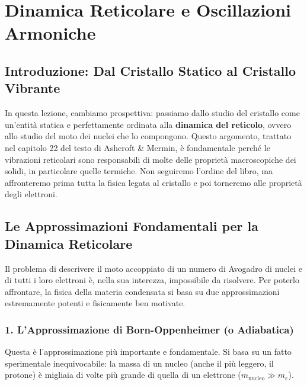 
\section{Dinamica Reticolare e Oscillazioni Armoniche}

\subsection{Introduzione: Dal Cristallo Statico al Cristallo Vibrante}
In questa lezione, cambiamo prospettiva: passiamo dallo studio del cristallo come un'entità statica e perfettamente ordinata alla \textbf{dinamica del reticolo}, ovvero allo studio del moto dei nuclei che lo compongono. Questo argomento, trattato nel capitolo 22 del testo di Ashcroft \& Mermin, è fondamentale perché le vibrazioni reticolari sono responsabili di molte delle proprietà macroscopiche dei solidi, in particolare quelle termiche. Non seguiremo l'ordine del libro, ma affronteremo prima tutta la fisica legata al cristallo e poi torneremo alle proprietà degli elettroni.

\subsection{Le Approssimazioni Fondamentali per la Dinamica Reticolare}

Il problema di descrivere il moto accoppiato di un numero di Avogadro di nuclei e di tutti i loro elettroni è, nella sua interezza, impossibile da risolvere. Per poterlo affrontare, la fisica della materia condensata si basa su due approssimazioni estremamente potenti e fisicamente ben motivate.

\subsubsection{1. L'Approssimazione di Born-Oppenheimer (o Adiabatica)}
Questa è l'approssimazione più importante e fondamentale. Si basa su un fatto sperimentale inequivocabile: la massa di un nucleo (anche il più leggero, il protone) è migliaia di volte più grande di quella di un elettrone (\(m_{\text{nucleo}} \gg m_e\)).

